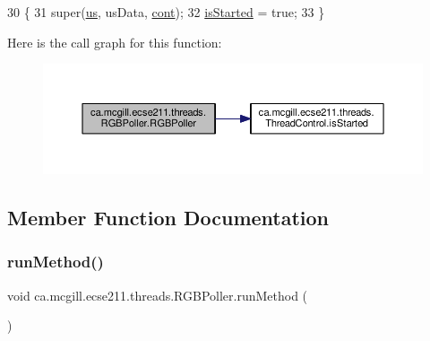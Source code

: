 \begin{DoxyCode}
30                                                                                                      \{
31     super(\hyperlink{classca_1_1mcgill_1_1ecse211_1_1threads_1_1_light_poller_ab6a9cb770bbf71f586697633db1475ff}{us}, usData, \hyperlink{classca_1_1mcgill_1_1ecse211_1_1threads_1_1_light_poller_ab6a9050ced4f6940add4735c8872194a}{cont});
32     \hyperlink{classca_1_1mcgill_1_1ecse211_1_1threads_1_1_thread_control_a92f4933511db42476e39956246bcf2fe}{isStarted} = \textcolor{keyword}{true};
33   \}
\end{DoxyCode}
Here is the call graph for this function\+:\nopagebreak
\begin{figure}[H]
\begin{center}
\leavevmode
\includegraphics[width=350pt]{classca_1_1mcgill_1_1ecse211_1_1threads_1_1_r_g_b_poller_a7e23e2fe527b2ecbf4ddc8f988dd70a5_cgraph}
\end{center}
\end{figure}


\subsection{Member Function Documentation}
\mbox{\label{classca_1_1mcgill_1_1ecse211_1_1threads_1_1_r_g_b_poller_a96db4561c87136de5098497fe30356fe}} 
\subsubsection{\texorpdfstring{run\+Method()}{runMethod()}}
{\footnotesize\ttfamily void ca.\+mcgill.\+ecse211.\+threads.\+R\+G\+B\+Poller.\+run\+Method (\begin{DoxyParamCaption}{ }\end{DoxyParamCaption})\hspace{0.3cm}{\ttfamily [protected]}}

